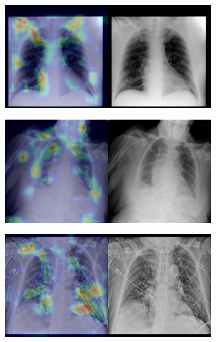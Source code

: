 \begin{figure}[b]
    \centering
    \begin{subfigure}{0.4\textwidth}
        \centering
        \includegraphics[width=1.0\textwidth]{Chapters/5. Conclusiones/img/COVID-19/1_1_0c9b15035c41_3ea703bd1e0b.png}
    \end{subfigure}
    \begin{subfigure}{0.4\textwidth}
        \centering
        \includegraphics[width=1.0\textwidth]{Chapters/5. Conclusiones/img/COVID-19/1_1_0d5082a9a044_d417f8e64511.png}
    \end{subfigure}
    \begin{subfigure}{0.4\textwidth}
        \centering
        \includegraphics[width=1.0\textwidth]{Chapters/5. Conclusiones/img/COVID-19/1_1_1b5ca94ac38b_68fcf433c6fe.png}

\end{subfigure}
\end{figure}
